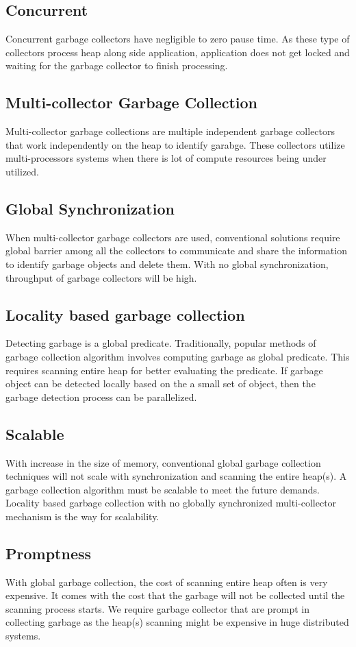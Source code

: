 \subsection{Concurrent}
	Concurrent garbage collectors have negligible to zero pause time. As these type of collectors process heap along side application, application does not get locked and waiting for the garbage collector to finish processing.
\subsection{Multi-collector Garbage Collection}
	Multi-collector garbage collections are multiple independent garbage collectors that work independently on the heap to identify garabge. These collectors utilize multi-processors systems when there is lot of compute resources being under utilized.
\subsection{Global Synchronization}
	When multi-collector garbage collectors are used, conventional solutions require global barrier among all the collectors to communicate and share the information to identify garbage objects and delete them. With no global synchronization, throughput of garbage collectors will be high.
\subsection{Locality based garbage collection}
	Detecting garbage is a global predicate. Traditionally, popular methods of garbage collection algorithm involves computing garbage as global predicate. This requires scanning entire heap for better evaluating the predicate. If garbage object can be detected locally based on the a small set of object, then the garbage detection process can be parallelized.
\subsection{Scalable}
	With increase in the size of memory, conventional global garbage collection techniques will not scale with synchronization and scanning the entire heap(s). A garbage collection algorithm must be scalable to meet the future demands. Locality based garbage collection with no globally synchronized multi-collector mechanism is the way for scalability.
\subsection{Promptness}
	With global garbage collection, the cost of scanning entire heap often is very expensive. It comes with the cost that the garbage will not be collected until the scanning process starts. We require garbage collector that are prompt in collecting garbage as the heap(s) scanning might be expensive in huge distributed systems.
